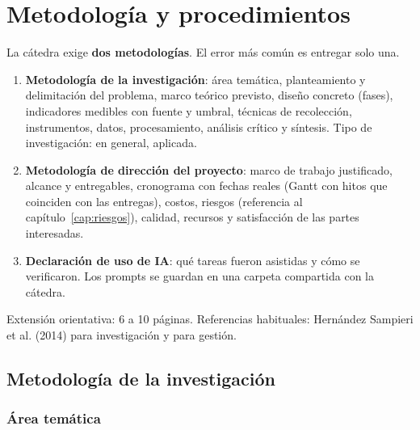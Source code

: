 
\chapter{Metodología y procedimientos}\label{cap:metodologia}

\begin{guia}
La cátedra exige \textbf{dos metodologías}. El error más común es
entregar solo una.
\begin{enumerate}
    \item \textbf{Metodología de la investigación}: área temática,
          planteamiento y delimitación del problema, marco teórico
          previsto, diseño concreto (fases), indicadores medibles con
          fuente y umbral, técnicas de recolección, instrumentos, datos,
          procesamiento, análisis crítico y síntesis. Tipo de
          investigación: en general, aplicada.
    \item \textbf{Metodología de dirección del proyecto}: marco de trabajo
          justificado, alcance y entregables, cronograma con fechas reales
          (Gantt con hitos que coinciden con las entregas), costos, riesgos
          (referencia al capítulo~\ref{cap:riesgos}), calidad, recursos y
          satisfacción de las partes interesadas.
    \item \textbf{Declaración de uso de IA}: qué tareas fueron asistidas y
          cómo se verificaron. Los prompts se guardan en una carpeta
          compartida con la cátedra.
\end{enumerate}
Extensión orientativa: 6 a 10 páginas. Referencias habituales:
Hernández Sampieri et al. (2014) para investigación y \citet{pmi2021}
para gestión.
\end{guia}

\section{Metodología de la investigación}\label{sec:n2.1}

\subsection{Área temática}\label{sec:n2.1.1}

